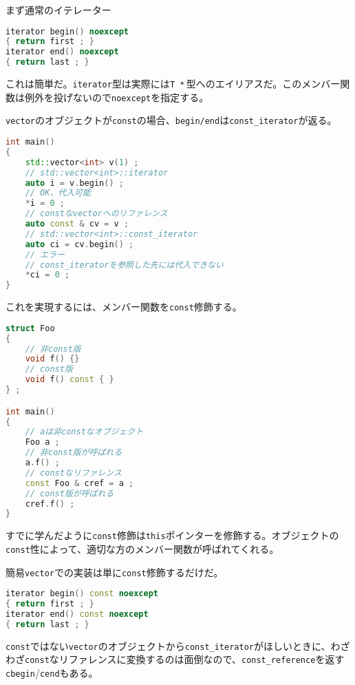 まず通常のイテレーター
\begin{lstlisting}[language={C++}]
iterator begin() noexcept
{ return first ; }
iterator end() noexcept
{ return last ; }
\end{lstlisting}
これは簡単だ。\texttt{iterator}型は実際には\texttt{T *}\,型へのエイリアスだ。このメンバー関数は例外を投げないので\texttt{noexcept}を指定する。

\texttt{vector}のオブジェクトが\texttt{const}の場合、\texttt{begin/end}は\texttt{const\_iterator}が返る。

\begin{lstlisting}[language={C++}]
int main()
{
    std::vector<int> v(1) ;
    // std::vector<int>::iterator
    auto i = v.begin() ;
    // OK、代入可能
    *i = 0 ;
    // constなvectorへのリファレンス
    auto const & cv = v ;
    // std::vector<int>::const_iterator
    auto ci = cv.begin() ;
    // エラー
    // const_iteratorを参照した先には代入できない
    *ci = 0 ;
}
\end{lstlisting}

これを実現するには、メンバー関数を\texttt{const}修飾する。

\begin{lstlisting}[language={C++}]
struct Foo
{
    // 非const版
    void f() {}
    // const版
    void f() const { }
} ;

int main()
{
    // aは非constなオブジェクト
    Foo a ;
    // 非const版が呼ばれる
    a.f() ;
    // constなリファレンス
    const Foo & cref = a ;
    // const版が呼ばれる
    cref.f() ;
}
\end{lstlisting}

すでに学んだように\texttt{const}修飾は\texttt{this}ポインターを修飾する。オブジェクトの\texttt{const}性によって、適切な方のメンバー関数が呼ばれてくれる。

簡易\texttt{vector}での実装は単に\texttt{const}修飾するだけだ。

\begin{lstlisting}[language={C++}]
iterator begin() const noexcept
{ return first ; }
iterator end() const noexcept
{ return last ; }
\end{lstlisting}

\texttt{const}ではない\texttt{vector}のオブジェクトから\texttt{const\_iterator}がほしいときに、わざわざ\texttt{const}なリファレンスに変換するのは面倒なので、\texttt{const\_reference}を返す\texttt{cbegin}/\texttt{cend}もある。

